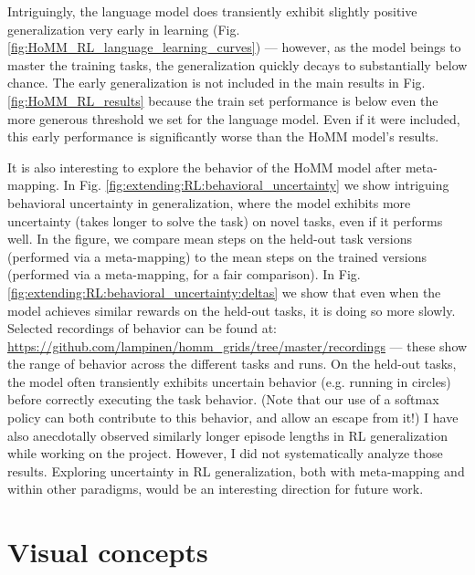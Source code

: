 Intriguingly, the language model does transiently exhibit slightly positive generalization very early in learning (Fig. \ref{fig:HoMM_RL_language_learning_curves}) --- however, as the model beings to master the training tasks, the generalization quickly decays to substantially below chance. The early generalization is not included in the main results in Fig. \ref{fig:HoMM_RL_results} because the train set performance is below even the more generous threshold we set for the language model. Even if it were included, this early performance is significantly worse than the HoMM model's results. \par

It is also interesting to explore the behavior of the HoMM model after meta-mapping. In Fig. \ref{fig:extending:RL:behavioral_uncertainty} we show intriguing behavioral uncertainty in generalization, where the model exhibits more uncertainty (takes longer to solve the task) on novel tasks, even if it performs well. In the figure, we compare mean steps on the held-out task versions (performed via a meta-mapping) to the mean steps on the trained versions (performed via a meta-mapping, for a fair comparison). In Fig. \ref{fig:extending:RL:behavioral_uncertainty:deltas} we show that even when the model achieves similar rewards on the held-out tasks, it is doing so more slowly. Selected recordings of behavior can be found at: \url{https://github.com/lampinen/homm_grids/tree/master/recordings} --- these show the range of behavior across the different tasks and runs. On the held-out tasks, the model often transiently exhibits uncertain behavior (e.g. running in circles) before correctly executing the task behavior. (Note that our use of a softmax policy can both contribute to this behavior, and allow an escape from it!) I have also anecdotally observed similarly longer episode lengths in RL generalization while working on the \citet{Hill2019a} project. However, I did not systematically analyze those results. Exploring uncertainty in RL generalization, both with meta-mapping and within other paradigms, would be an interesting direction for future work.




\section{Visual concepts} \label{sec:extending:concepts}

